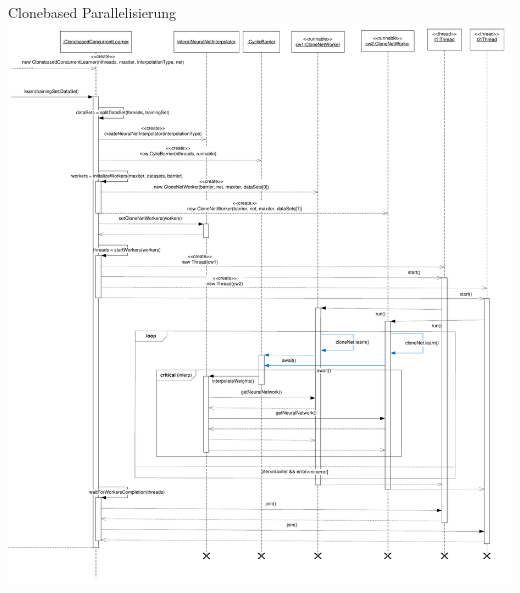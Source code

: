 \documentclass[18pt]{beamer}
\begin{document}
\begin{frame}[allowframebreaks]{Clonebased Parallelisierung}
	\framebreak
		\includegraphics[height=0.8\textheight]{Grafiken/Clonebased_sequencediagram}
	\end{frame}
\end{document}
